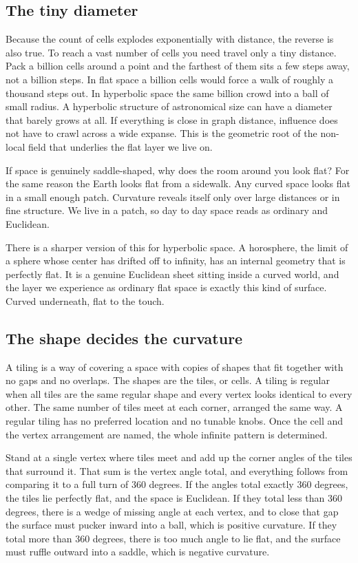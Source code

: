 \subsection{The tiny diameter}

Because the count of cells explodes exponentially with distance, the reverse is also true. To reach a vast
number of cells you need travel only a tiny distance. Pack a billion cells around a point and the farthest
of them sits a few steps away, not a billion steps. In flat space a billion cells would force a walk of
roughly a thousand steps out. In hyperbolic space the same billion crowd into a ball of small radius. A
hyperbolic structure of astronomical size can have a diameter that barely grows at all. If everything is
close in graph distance, influence does not have to crawl across a wide expanse. This is the geometric root
of the non-local field that underlies the flat layer we live on.

If space is genuinely saddle-shaped, why does the room around you look flat? For the same reason the Earth
looks flat from a sidewalk. Any curved space looks flat in a small enough patch. Curvature reveals itself
only over large distances or in fine structure. We live in a patch, so day to day space reads as ordinary
and Euclidean.

There is a sharper version of this for hyperbolic space. A horosphere, the limit of a sphere whose center
has drifted off to infinity, has an internal geometry that is perfectly flat. It is a genuine Euclidean
sheet sitting inside a curved world, and the layer we experience as ordinary flat space is exactly this kind
of surface. Curved underneath, flat to the touch.

\subsection{The shape decides the curvature}

A tiling is a way of covering a space with copies of shapes that fit together with no gaps and no overlaps.
The shapes are the tiles, or cells. A tiling is regular when all tiles are the same regular shape and every
vertex looks identical to every other. The same number of tiles meet at each corner, arranged the same way.
A regular tiling has no preferred location and no tunable knobs. Once the cell and the vertex arrangement
are named, the whole infinite pattern is determined.

Stand at a single vertex where tiles meet and add up the corner angles of the tiles that surround it. That
sum is the vertex angle total, and everything follows from comparing it to a full turn of $360$ degrees. If
the angles total exactly $360$ degrees, the tiles lie perfectly flat, and the space is Euclidean. If they
total less than $360$ degrees, there is a wedge of missing angle at each vertex, and to close that gap the
surface must pucker inward into a ball, which is positive curvature. If they total more than $360$ degrees,
there is too much angle to lie flat, and the surface must ruffle outward into a saddle, which is negative
curvature.

